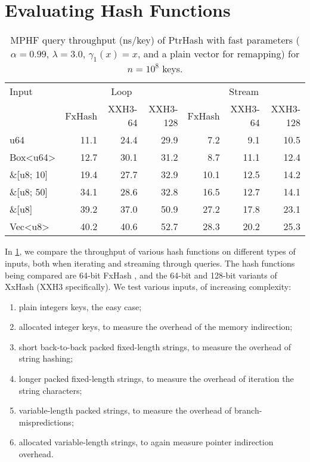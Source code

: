 \documentclass[a4paper,UKenglish,cleveref,thm-restate]{lipics-v2021}
\begin{document}
\section{Evaluating Hash Functions}
\label{hash-eval}
\begin{table}[b]
\caption{\label{hashes}MPHF query throughput (ns/key) of PtrHash with fast parameters (\(\alpha=0.99\), \(\lambda=3.0\), \(\gamma_1(x)=x\), and a plain vector for remapping) for \(n=10^8\) keys.}
\centering
\begin{tabular}{lrrrrrr}
  \toprule
Input &
\multicolumn{3}{c}{Loop} &
\multicolumn{3}{c}{Stream}  \\
\cmidrule(lr){2-4}
\cmidrule(lr){5-7}
 & FxHash & XXH3-64 & XXH3-128 & FxHash & XXH3-64 & XXH3-128\\
\midrule
u64 & 11.1 & 24.4 & 29.9 & 7.2 & 9.1 & 10.5\\
Box<u64> & 12.7 & 30.1 & 31.2 & 8.7 & 11.1 & 12.4\\
\&[u8; 10] & 19.4 & 27.7 & 32.9 & 10.1 & 12.5 & 14.2\\
\&[u8; 50] & 34.1 & 28.6 & 32.8 & 16.5 & 12.7 & 14.1\\
\&[u8] & 39.2 & 37.0 & 50.9 & 27.2 & 17.8 & 23.1\\
Vec<u8> & 40.2 & 40.6 & 52.7 & 28.3 & 20.2 & 25.3\\
\bottomrule
\end{tabular}
\end{table}

In \cref{hashes}, we compare the throughput of various hash functions on different
types of inputs, both when iterating and streaming through queries.
The hash functions being compared are 64-bit FxHash \cite{fxhash}, and the
64-bit and 128-bit variants of XxHash (XXH3 specifically).
We test various inputs, of increasing complexity:
\begin{enumerate}
\item plain integers keys, the easy case;
\item allocated integer keys, to measure the overhead of the memory indirection;
\item short back-to-back packed fixed-length strings, to measure the overhead of string hashing;
\item longer packed fixed-length strings, to measure the overhead of iteration the string characters;
\item variable-length packed strings, to measure the overhead of branch-mispredictions;
\item allocated variable-length strings, to again measure pointer indirection
overhead.
\end{enumerate}
\end{document}
